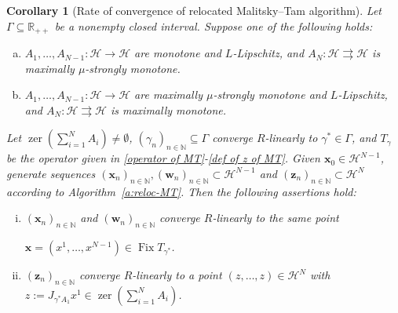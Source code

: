 \documentclass[a4paper,12pt]{article}
\newtheorem{corollary}[theorem]{Corollary}
\DeclareMathOperator{\Fix}{Fix}
\DeclareMathOperator{\zer}{zer}
\newcommand{\setto}{\rightrightarrows}
\begin{document}
\begin{corollary}[Rate of convergence of relocated Malitsky--Tam algorithm]
Let $\Gamma\subseteq\mathbb{R}_{++}$ be a nonempty closed interval. Suppose one of the following holds:
 \begin{enumerate}[(a)]
     \item \label{condition 1} $A_1,\dots,A_{N-1}:\mathcal{H}\rightarrow\mathcal{H}$ are monotone and $L$-Lipschitz, and $A_N:\mathcal{H}\setto\mathcal{H}$ is maximally $\mu$-strongly monotone.
     \item \label{condition 2}  $A_1,\dots,A_{N-1}:\mathcal{H}\rightarrow\mathcal{H}$ are maximally $\mu$-strongly monotone and $L$-Lipschitz, and $A_N:\mathcal{H}\setto\mathcal{H}$ is maximally monotone.
 \end{enumerate}
  Let $\zer(\sum_{i=1}^NA_i)\neq\emptyset$, $(\gamma_n)_{n\in\mathbb{N}}\subseteq\Gamma$ converge $R$-linearly to $\gamma^*\in\Gamma$, and $T_\gamma$ be the operator given in \eqref{operator of MT}-\eqref{def of z of MT}. Given $\mathbf{x}_0\in\mathcal{H}^{N-1}$, generate  sequences $(\mathbf{x}_n)_{n\in\mathbb{N}},(\mathbf{w}_n)_{n\in\mathbb{N}}\subset\mathcal{H}^{N-1}$ and $(\mathbf{z}_n)_{n\in\mathbb{N}}\subset\mathcal{H}^N$ according to Algorithm~\ref{a:reloc-MT}. Then the following assertions hold:
\begin{enumerate}[(i)]
    \item \label{cor:MT fixed-point-convergence for contraction} $(\mathbf{x}_n)_{n\in\mathbb{N}}$ and $(\mathbf{w}_n)_{n\in\mathbb{N}}$ converge  $R$-linearly to the same point 
    
    $\mathbf{x}=(x^1,\dots,x^{N-1})\in\Fix T_{\gamma^*}$.
    \item \label{cor:MT primal-convergence for contraction} $(\mathbf{z}_n)_{n\in\mathbb{N}}$ converge $R$-linearly to a point $(z,\dots,z)\in\mathcal{H}^N$ with $z := J_{\gamma^*A_1}x^1\in\zer(\sum_{i=1}^N A_i)$.
    \end{enumerate}
\end{corollary}
\end{document}
